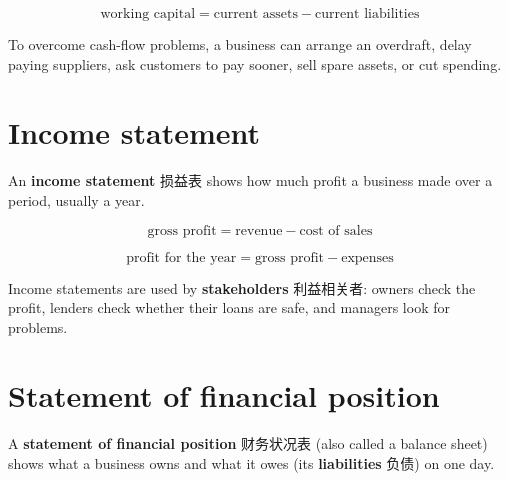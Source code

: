 \documentclass[11pt]{article}
\begin{document}
\[
\text{working capital} = \text{current assets} - \text{current liabilities}
\]

To overcome cash-flow problems, a business can arrange an overdraft, delay paying suppliers, ask customers to pay sooner, sell spare assets, or cut spending.

\section*{Income statement}

An \textbf{income statement} 损益表 shows how much profit a business made over a period, usually a year.

\begin{center}
\end{center}

\[
\text{gross profit} = \text{revenue} - \text{cost of sales}
\]

\[
\text{profit for the year} = \text{gross profit} - \text{expenses}
\]

Income statements are used by \textbf{stakeholders} 利益相关者: owners check the profit, lenders check whether their loans are safe, and managers look for problems.

\section*{Statement of financial position}

A \textbf{statement of financial position} 财务状况表 (also called a balance sheet) shows what a business owns and what it owes (its \textbf{liabilities} 负债) on one day.
\end{document}
